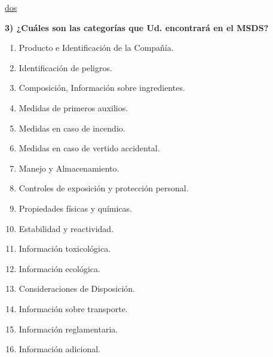 \documentclass[letterpaper,11pt]{article}
\begin{document}
\href{https://www.carlroth.com/medias/SDB-4309-ES-ES.pdf?context=bWFzdGVyfHNlY3VyaXR5RGF0YXNoZWV0c3wxNzYxNDR8YXBwbGljYXRpb24vcGRmfHNlY3VyaXR5RGF0YXNoZWV0cy9oNDEvaDMyLzg5NTA4ODUyNTMxNTAucGRmfDNlNjhiMGU1ODA0YTBmZTQ2MTdhYmQxNmU1OTAxY2UzNmNiNGQ0YTdiOGVjNWRjOGI2N2ZkNzE0MTk1ODRkZjQ}{dos}

\textbf{3) ¿Cuáles son las categorías que Ud. encontrará en el MSDS?}
\begin{enumerate}
    \item Producto e Identificación de la Compañía.
    \item Identificación de peligros.
    \item Composición, Información sobre ingredientes.
    \item Medidas de primeros auxilios.
    \item Medidas en caso de incendio.
    \item Medidas en caso de vertido accidental.
    \item Manejo y Almacenamiento.
    \item Controles de exposición y protección personal.
    \item Propiedades físicas y químicas.
    \item Estabilidad y reactividad.
    \item  Información toxicológica.
    \item Información ecológica.
    \item Consideraciones de Disposición.
    \item Información sobre transporte.
    \item Información reglamentaria.
    \item Información adicional.
\end{enumerate}
 
\end{document}
